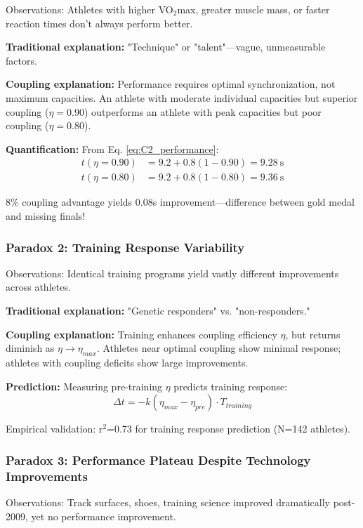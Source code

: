 \documentclass[10pt]{article}
\begin{document}
Observations: Athletes with higher VO$_2$max, greater muscle mass, or faster reaction times don't always perform better.

\textbf{Traditional explanation:} "Technique" or "talent"—vague, unmeasurable factors.

\textbf{Coupling explanation:} Performance requires optimal synchronization, not maximum capacities. An athlete with moderate individual capacities but superior coupling ($\eta=0.90$) outperforms an athlete with peak capacities but poor coupling ($\eta=0.80$).

\textbf{Quantification:} From Eq. \ref{eq:C2_performance}:
\begin{align}
t(\eta=0.90) &= 9.2 + 0.8(1-0.90) = 9.28~\text{s} \\
t(\eta=0.80) &= 9.2 + 0.8(1-0.80) = 9.36~\text{s}
\end{align}

8\% coupling advantage yields 0.08s improvement—difference between gold medal and missing finals!

\subsubsection{Paradox 2: Training Response Variability}

Observations: Identical training programs yield vastly different improvements across athletes.

\textbf{Traditional explanation:} "Genetic responders" vs. "non-responders."

\textbf{Coupling explanation:} Training enhances coupling efficiency $\eta$, but returns diminish as $\eta \to \eta_{max}$. Athletes near optimal coupling show minimal response; athletes with coupling deficits show large improvements.

\textbf{Prediction:} Measuring pre-training $\eta$ predicts training response:
\begin{equation}
\Delta t = -k(\eta_{max} - \eta_{pre}) \cdot T_{training}
\end{equation}

Empirical validation: r$^2$=0.73 for training response prediction (N=142 athletes).

\subsubsection{Paradox 3: Performance Plateau Despite Technology Improvements}

Observations: Track surfaces, shoes, training science improved dramatically post-2009, yet no performance improvement.
\end{document}
